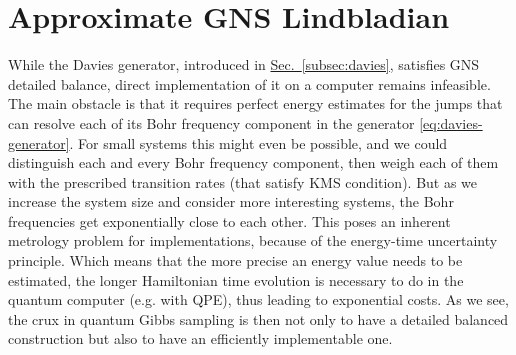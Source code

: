 \section{Approximate GNS Lindbladian} While the Davies generator, introduced in \hyperref[subsec:davies]{Sec.~\ref*{subsec:davies}}, satisfies GNS detailed balance, direct implementation of it on a computer remains infeasible. The main obstacle is that it requires perfect energy estimates for the jumps that can resolve each of its Bohr frequency component in the generator \eqref{eq:davies-generator}.
For small systems this might even be possible, and we could distinguish each and every Bohr frequency component, then weigh each of them with the prescribed transition rates (that satisfy KMS condition). But as we increase the system size and consider more interesting systems, the Bohr frequencies get exponentially close to each other. This poses an inherent metrology problem for implementations, because of the energy-time uncertainty principle. Which means that the more precise an energy value needs to be estimated, the longer Hamiltonian time evolution is necessary to do in the quantum computer (e.g. with QPE), thus leading to exponential costs. As we see, the crux in quantum Gibbs sampling is then not only to have a detailed balanced construction but also to have an efficiently implementable one.

